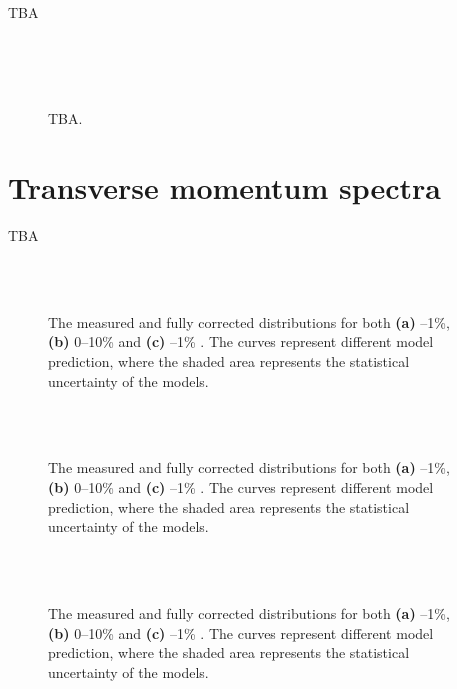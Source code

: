 TBA
 
\begin{figure}%
\\
\\
\\
\caption{TBA.}
\label{fig:rt:meanptK0s}
\end{figure}

\section{Transverse momentum spectra}

TBA

\begin{figure}%
\\
\\
\caption{The measured and fully corrected \SOPT distributions for both \textbf{(a)} --1\%, \textbf{(b)} 0--10\% and \textbf{(c)} --1\% . The curves represent different model prediction, where the shaded area represents the statistical uncertainty of the models.}
\label{fig:rt:ptK0s}
\end{figure}


\begin{figure}%
\\
\\
\caption{The measured and fully corrected \SOPT distributions for both \textbf{(a)} --1\%, \textbf{(b)} 0--10\% and \textbf{(c)} --1\% . The curves represent different model prediction, where the shaded area represents the statistical uncertainty of the models.}
\label{fig:rt:ptK0sMC}
\end{figure}

\begin{figure}%
\\
\\
\caption{The measured and fully corrected \SOPT distributions for both \textbf{(a)} --1\%, \textbf{(b)} 0--10\% and \textbf{(c)} --1\% . The curves represent different model prediction, where the shaded area represents the statistical uncertainty of the models.}
\label{fig:rt:ptK0s}
\end{figure}


